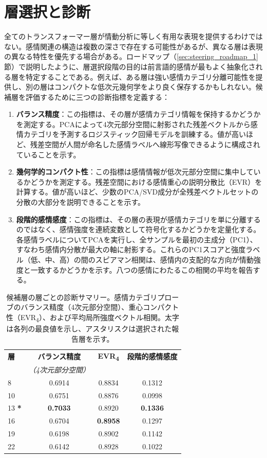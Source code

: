 \section{層選択と診断}
\label{sec:layer_selection}

全てのトランスフォーマー層が情動分析に等しく有用な表現を提供するわけではない。感情関連の構造は複数の深さで存在する可能性があるが、異なる層は表現の異なる特性を優先する場合がある。ロードマップ（\ref{sec:steering_roadmap_1}節）で説明したように、層選択段階の目的は前言語的感情が最もよく抽象化される層を特定することである。例えば、ある層は強い感情カテゴリ分離可能性を提供し、別の層はコンパクトな低次元幾何学をより良く保存するかもしれない。候補層を評価するために三つの診断指標を定義する：

\begin{enumerate}
  \item \textbf{バランス精度}：この指標は、その層が感情カテゴリ情報を保持するかどうかを測定する。PCAによって4次元部分空間に射影された残差ベクトルから感情カテゴリを予測するロジスティック回帰モデルを訓練する。値が高いほど、残差空間が人間が命名した感情ラベルへ線形写像できるように構成されていることを示す。
  \item \textbf{幾何学的コンパクト性}：この指標は感情情報が低次元部分空間に集中しているかどうかを測定する。残差空間における感情重心の説明分散比（EVR）を計算する。値が高いほど、少数のPCA/SVD成分が全残差ベクトルセットの分散の大部分を説明できることを示す。
  \item \textbf{段階的感情感度}：この指標は、その層の表現が感情カテゴリを単に分離するのではなく、感情強度を連続変数として符号化するかどうかを定量化する。各感情ラベルについてPCAを実行し、全サンプルを最初の主成分（PC1）、すなわち感情内分散が最大の軸に射影する。これらのPC1スコアと強度ラベル（低、中、高）の間のスピアマン相関は、感情内の支配的な方向が情動強度と一致するかどうかを示す。八つの感情にわたるこの相関の平均を報告する。
\end{enumerate}

\begin{table}[H]
\centering
\small
\begin{tabular}{lccc}
\toprule
\textbf{層} &
  \textbf{バランス精度} &
  \textbf{EVR\textsubscript{4}} &
  \textbf{段階的感情感度} \\
  & \textit{（4次元部分空間）} & & \\
\midrule
  8  & 0.6914 & 0.8834 & 0.1312 \\
  10 & 0.6751 & 0.8876 & 0.0998 \\
  13 \textbf{*} & \textbf{0.7033} & 0.8920 & \textbf{0.1336} \\
  16 & 0.6704 & \textbf{0.8958} & 0.1297 \\
  19 & 0.6198 & 0.8902 & 0.1142 \\
  22 & 0.6142 & 0.8928 & 0.1022 \\
\bottomrule
\end{tabular}
\caption{候補層の層ごとの診断サマリー。感情カテゴリプローブのバランス精度（4次元部分空間）、重心コンパクト性（EVR\textsubscript{4}）、および平均局所強度ベクトル相関。太字は各列の最良値を示し、アスタリスクは選択された報告層を示す。}
\label{tab:layer_diagnostics}
\end{table}


